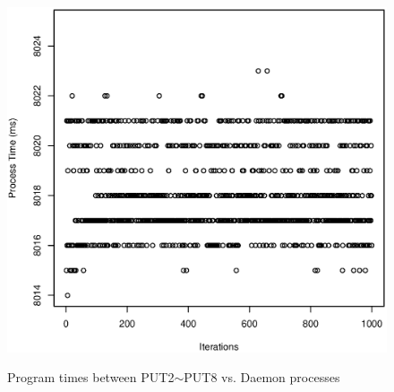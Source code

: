 \documentclass[10pt]{article}
\begin{document}
\begin{figure}[htp!]
{		\includegraphics[scale=0.35]{put8_pt.eps}
		\label{fig:put8_pt}
	}
	\caption{Program times between PUT2$\sim$PUT8 vs. Daemon processes~\label{fig:put_daemon_pt}}
\end{figure}
\end{document}
